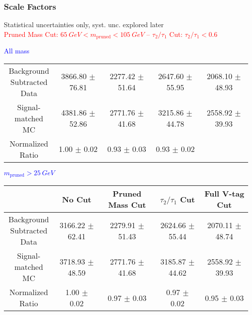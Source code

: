 \documentclass{beamer}
\newcommand{\highlight}[1]{\fcolorbox{red}{yellow}{#1}}
\begin{document}
\begin{frame}
  \frametitle{Scale Factors}

  Statistical uncertainties only, syst. unc. explored later \\
  \textcolor{red}{\scriptsize
    Pruned Mass Cut: $\SI{65}{GeV} < m_\text{pruned} < \SI{105}{GeV}$ -- 
    $\tau_2/\tau_1$ Cut: $\tau_2/\tau_1 < 0.6$ \\ \vspace{-12pt}
  }

  \begin{adjustwidth}{-2.5em}{-2.5em}
    \centering
    \vspace{6pt}
    \textcolor{blue}{All mass}
    \vspace{6pt}

    {\scriptsize
      \begin{tabular}{| c | c | c | c | c |}
        \hline
        \makecell{Background \\ Subtracted \\ Data} & 3866.80 $\pm$ 76.81 & 2277.42 $\pm$ 51.64 & 2647.60 $\pm$ 55.95 & 2068.10 $\pm$ 48.93 \\
        \makecell{Signal-\\ matched MC} & 4381.86 $\pm$ 52.86 & 2771.76 $\pm$ 41.68 & 3215.86 $\pm$ 44.78 & 2558.92 $\pm$ 39.93 \\
        \hline
        \makecell{Normalized \\ Ratio} & 1.00 $\pm$ 0.02 & 0.93 $\pm$ 0.03 & 0.93 $\pm$ 0.02 & \highlight{0.92 $\pm$ 0.03} \\
        \hline
      \end{tabular}
    }

    \vspace{6pt}
    \textcolor{blue}{$m_\text{pruned} > \SI{25}{GeV}$}
    \vspace{6pt}

    {\scriptsize
      \begin{tabular}{| c | c | c | c | c |}
        \hline
        & No Cut & Pruned Mass Cut & $\tau_2/\tau_1$ Cut & Full V-tag Cut \\
        \hline
        \makecell{Background \\ Subtracted \\ Data} & 3166.22 $\pm$ 62.41 & 2279.91 $\pm$ 51.43 & 2624.66 $\pm$ 55.44 & 2070.11 $\pm$ 48.74 \\
        \makecell{Signal-\\ matched MC} & 3718.93 $\pm$ 48.59 & 2771.76 $\pm$ 41.68 & 3185.87 $\pm$ 44.62 & 2558.92 $\pm$ 39.93 \\
        \hline
        \makecell{Normalized \\ Ratio} & 1.00 $\pm$ 0.02 & 0.97 $\pm$ 0.03 & 0.97 $\pm$ 0.02 & 0.95 $\pm$ 0.03 \\
        \hline
      \end{tabular}
    }
  \end{adjustwidth}

\end{frame}
\end{document}
